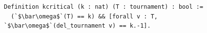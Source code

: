 \begin{lstlisting}[language=Rocq]
Definition kcritical (k : nat) (T : tournament) : bool :=
  (`$\bar\omega$`(T) == k) && [forall v : T, `$\bar\omega$`(del_tournament v) == k.-1].
\end{lstlisting}
